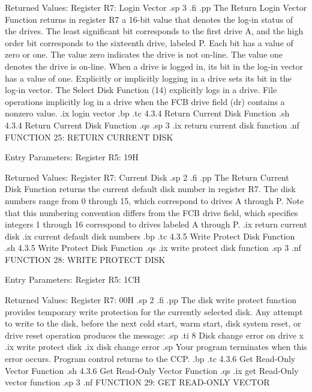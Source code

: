                  Returned  Values:
                    Register   R7:  Login Vector
.sp 3
.fi
.pp
The Return Login Vector Function returns in register   R7 a 16-bit value
that denotes the log-in status of the drives. The least significant bit
corresponds to the first drive A, and the high order bit corresponds to the
sixteenth drive, labeled P. Each bit has a value of zero or one. The value
zero indicates the drive is not on-line.  The value one denotes the drive
is on-line. When a drive is logged in, its bit in the log-in vector has a
value of one. Explicitly or implicitly logging in a drive sets its bit
in the log-in vector. The Select Disk Function (14) explicitly logs in a
drive. File operations implicitly log in a drive when the FCB drive field
(dr) contains a nonzero value. 
.ix login vector
.bp
.tc         4.3.4  Return Current Disk Function
.sh
4.3.4  Return Current Disk Function
.qs
.sp 3
.ix return current disk function
.nf
                FUNCTION 25:  RETURN CURRENT DISK

                 Entry Parameters:
                    Register   R5:  19H

                 Returned  Values:
                    Register   R7:  Current Disk
.sp 2
.fi
.pp
The Return Current Disk Function returns the current default disk
number in register   R7.  The disk numbers range from 0 through
15, which correspond to drives A through P. Note that this 
numbering convention differs from the FCB drive 
field, which specifies integers 1 through 16 
correspond to drives labeled A through P.
.ix return current disk
.ix current default disk numbers
.bp
.tc         4.3.5  Write Protect Disk Function
.sh
4.3.5  Write Protect Disk Function
.qs
.ix write protect disk function
.sp 3
.nf
                FUNCTION 28:  WRITE PROTECT DISK

                     Entry Parameters:
                        Register   R5:  1CH

                     Returned  Values:
                        Register   R7:  00H
.sp 2
.fi
.pp
The disk write protect function provides temporary write protection for the 
currently selected disk.  Any attempt
to write to the disk, before the next cold start, warm start,
disk system reset, or drive reset operation produces the message:
.sp
.ti 8
Disk change error on drive x 
.ix write protect disk
.ix disk change error
.sp
Your program terminates when this error occurs.  Program control returns
to the CCP.
.bp
.tc         4.3.6  Get Read-Only Vector Function
.sh
4.3.6  Get Read-Only Vector Function
.qs
.ix get Read-Only vector function
.sp 3
.nf
               FUNCTION 29:  GET READ-ONLY VECTOR


